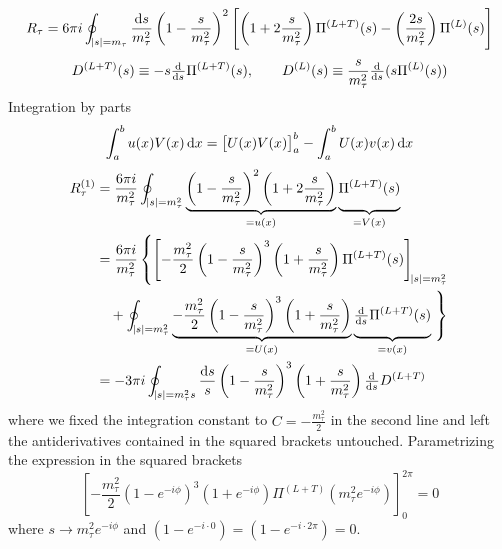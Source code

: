 \documentclass[../../index.tex]{subfiles}
\begin{document}
\begin{equation}
  R_\tau = 6 \pi i \oint_{\abs{s}=m_\tau} \frac{\dif s}{m_\tau^2} \left( 1 - \frac{s}{m_\tau^2} \right)^2 \left[ \left( 1 + 2 \frac{s}{m_\tau^2} \right) \Pi^{(L+T)}(s) - \left( \frac{2 s}{m_\tau^2} \right) \Pi^{(L)}(s) \right]
\end{equation}
\begin{equation}
  \label{eq:adlerFunction}
  D^{(L+T)}(s) \equiv -s \od{}{s} \Pi^{(L+T)}(s), \qquad D^{(L)}(s) \equiv \frac{s}{m_\tau^2} \od{}{s} (s \Pi^{(L)}(s))
\end{equation}
Integration by parts
\begin{equation}
  \int_a^b u(x) V(x) \dif x = \left[ U(x) V(x) \right]_a^b - \int_a^b U(x) v(x) \dif x
\end{equation}
\begin{equation}
  \begin{split}
    R_\tau^{(1)} &= \frac{6 \pi i}{m_\tau^2} \oint_{\abs{s}=m_\tau^2}\underbrace{\left( 1 - \frac{s}{m_\tau^2} \right)^2 \left( 1 + 2 \frac{s}{m_\tau^2} \right)}_{=u(x)} \underbrace{ \vphantom{\left( \frac{s}{m_\tau^2} \right)} \Pi^{(L+T)}(s)}_{=V(x)} \\
    &= \frac{6 \pi i}{m_\tau^2} \left\{  \left[ -\frac{m_\tau^2}{2} \left( 1 - \frac{s}{m_\tau^2} \right)^3 \left( 1 + \frac{s}{m_\tau^2} \right) \Pi^{(L+T)}(s) \right]_{\abs{s}=m_\tau^2} \right. \\
    &\quad+ \oint_{\abs{s}=m_\tau^2} \underbrace{-\frac{m_\tau^2}{2} \left( 1 - \frac{s}{m_\tau^2} \right)^3 \left( 1 + \frac{s}{m_\tau^2} \right)}_{=U(x)} \underbrace{\vphantom{\left( \frac{1}{m_\tau^2} \right)}\od{}{s} \Pi^{(L+T)}(s)}_{=v(x)} \left. \vphantom{\left[ \left( \frac{1}{m_\tau^2} \right) \right]} \right\} \\
    &= -3 \pi i \oint_{\abs{s}=m_\tau^2s} \frac{\dif s}{s} \left( 1 - \frac{s}{m_\tau^2} \right)^3 \left( 1 + \frac{s}{m_\tau^2} \right) \od{}{s} D^{(L+T)}
  \end{split}
\end{equation}
where we fixed the integration constant to $C=-\frac{m_\tau^2}{2}$ in the second
line and left the antiderivatives contained in the squared brackets untouched.
Parametrizing the expression in the squared brackets
\begin{equation}
    \left[ -\frac{m_\tau^2}{2} \left( 1 - e^{-i \phi} \right)^3 \left( 1 + e^{-i \phi} \right) \Pi^{(L+T)}(m_\tau^2 e^{-i \phi}) \right]_0^{2\pi} = 0
\end{equation}
where $s \to m_\tau^2 e^{-i \phi}$ and $(1 - e^{-i \cdot 0}) = (1 - e^{-i \cdot 2 \pi})
= 0$.
\end{document}
